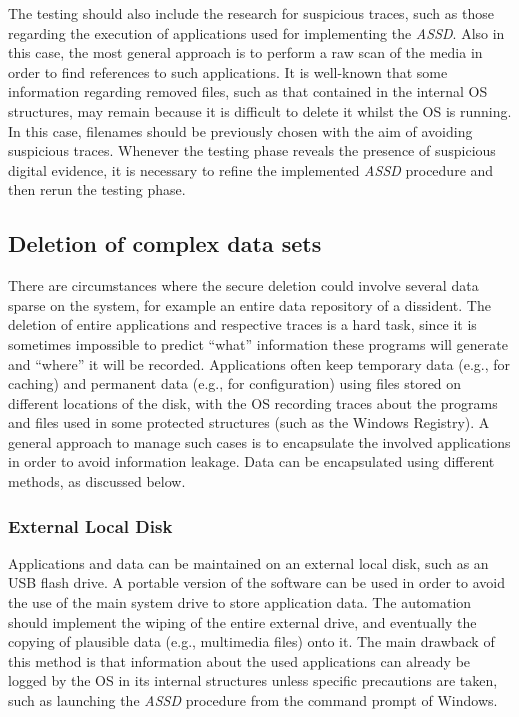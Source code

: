 \documentclass[conference]{IEEEtran}
\newcommand{\assd}{\emph{ASSD}\xspace}
\begin{document}
The testing should also include the research for suspicious traces, such as those regarding the execution of applications used for implementing the \assd. Also in this case, the most general approach is to perform a raw scan of the media in order to find references to such applications. It is well-known that some information regarding removed files, such as that contained in the internal OS structures, may remain because it is difficult to delete it whilst the OS is running. In this case, filenames should be previously chosen with the aim of avoiding suspicious traces. Whenever the testing phase reveals the presence of suspicious digital evidence, it is necessary to refine the implemented \assd procedure and then rerun the testing phase.


\subsection{Deletion of complex data sets}
\label{par:env}
There are circumstances where the secure deletion could involve several data sparse on the system, for example an entire data repository of a dissident.
The deletion of entire applications and respective traces is a hard task, since it is sometimes impossible to predict ``what'' information these programs will generate and ``where'' it will be recorded. Applications often keep temporary data (e.g., for caching) and permanent data (e.g., for configuration) using files stored on different locations of the disk, with the OS recording traces about the programs and files used in some protected structures (such as the Windows Registry). A general approach to manage such cases is to encapsulate the involved applications in order to avoid information leakage. Data can be encapsulated using different methods, as discussed below.

\subsubsection{External Local Disk}
Applications and data can be maintained on an external local disk, such as an USB flash drive. A portable version of the software can be used in order to avoid the use of the main system drive to store application data. The automation should implement the wiping of the entire external drive, and eventually the copying of plausible data (e.g., multimedia files) onto it.
The main drawback of this method is that information about the used applications can already be logged by the OS in its internal structures unless specific precautions are taken, such as launching the \assd procedure from the command prompt of Windows.
\end{document}
